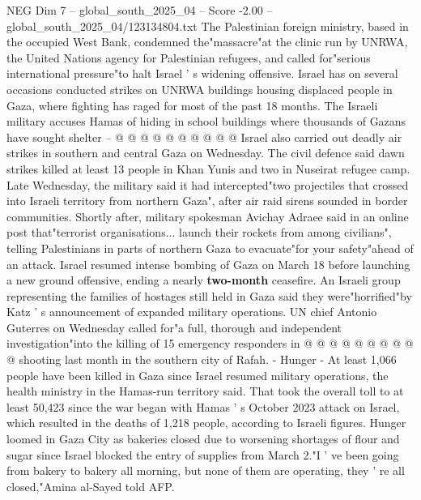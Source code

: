 \begin{textsample}{NEG Dim 7 – global\_south\_2025\_04 – Score -2.00 – global\_south\_2025\_04/123134804.txt}
The Palestinian foreign ministry, based in the occupied West Bank, condemned the"massacre"at the clinic run by UNRWA, the United Nations agency for Palestinian refugees, and called for"serious international pressure"to halt Israel ' s widening offensive.
Israel has on several occasions conducted strikes on UNRWA buildings housing displaced people in Gaza, where fighting has raged for most of the past 18 months.
The Israeli military accuses Hamas of hiding in school buildings where thousands of Gazans have sought shelter -- @ @ @ @ @ @ @ @ @ @ Israel also carried out deadly air strikes in southern and central Gaza on Wednesday.
The civil defence said dawn strikes killed at least 13 people in Khan Yunis and two in Nuseirat refugee camp.
Late Wednesday, the military said it had intercepted"two projectiles that crossed into Israeli territory from northern Gaza", after air raid sirens sounded in border communities.
Shortly after, military spokesman Avichay Adraee said in an online post that"terrorist organisations... launch their rockets from among civilians", telling Palestinians in parts of northern Gaza to evacuate"for your safety"ahead of an attack.
Israel resumed intense bombing of Gaza on March 18 before launching a new ground offensive, ending a nearly \textbf{two-month} ceasefire.
An Israeli group representing the families of hostages still held in Gaza said they were"horrified"by Katz ' s announcement of expanded military operations.
UN chief Antonio Guterres on Wednesday called for"a full, thorough and independent investigation"into the killing of 15 emergency responders in @ @ @ @ @ @ @ @ @ @ shooting last month in the southern city of Rafah. - Hunger - At least 1,066 people have been killed in Gaza since Israel resumed military operations, the health ministry in the Hamas-run territory said.
That took the overall toll to at least 50,423 since the war began with Hamas ' s October 2023 attack on Israel, which resulted in the deaths of 1,218 people, according to Israeli figures.
Hunger loomed in Gaza City as bakeries closed due to worsening shortages of flour and sugar since Israel blocked the entry of supplies from March 2."I ' ve been going from bakery to bakery all morning, but none of them are operating, they ' re all closed,"Amina al-Sayed told AFP.

\end{textsample}
